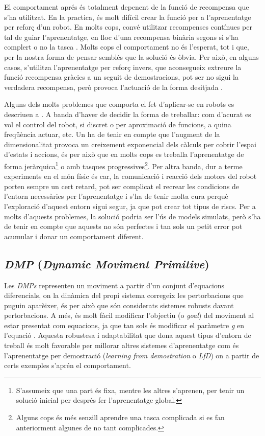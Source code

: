 \documentclass[12pt,a4paper,final,twoside]{report}
\begin{document}
El comportament aprés és totalment depenent de la funció de recompensa que s'ha utilitzat. En la practica, és molt difícil crear la funció per a l'aprenentatge per reforç d'un robot. En molts cops, convé utilitzar recompenses contínues per tal de guiar l'aprenentatge, en lloc d'una recompensa binària segons si s'ha complert o no la tasca \cite{Laud2004}. Molts cops el comportament no és l'esperat, tot i que, per la nostra forma de pensar semblés que la solució és òbvia. Per això, en alguns casos, s'utilitza l'aprenentatge per reforç invers, que aconsegueix extreure la funció recompensa gràcies a un seguit de demostracions, pot ser no sigui la verdadera recompensa, però provoca l'actuació de la forma desitjada \cite{Kober2009}.

Alguns dels molts problemes que comporta el fet d'aplicar-se en robots es descriuen a \cite{Kober2009}. A banda d'haver de decidir la forma de treballar: com d'acurat es vol el control del robot, si discret o per aproximació de funcions, a quina freqüència actuar, etc. Un ha de tenir en compte que l'augment de la dimensionalitat provoca un creixement exponencial dels càlculs per cobrir l'espai d'estats i accions, és per això que en molts cops es treballa l'aprenentatge de forma jeràrquica\footnote{S'assumeix que una part és fixa, mentre les altres s'aprenen, per tenir un solució inicial per després fer l'aprenentatge global.} o amb tasques progressives\footnote{Alguns cops és més senzill aprendre una tasca complicada si es fan anteriorment algunes de no tant complicades.}. 
Per altra banda, dur a terme experiments en el món físic és car, la comunicació i reacció dels motors del robot porten sempre un cert retard, pot ser complicat el recrear les condicions de l'entorn necessàries per l'aprenentatge i s'ha de tenir molta cura perquè l'exploració d'aquest entorn sigui segur, ja que pot crear tot tipus de riscs. Per a molts d'aquests problemes, la solució podria ser l'ús de models simulats, però s'ha de tenir en compte que aquests no són perfectes i tan sols un petit error pot acumular i donar un comportament diferent.

\subsection{\textit{DMP} (\textit{\textbf{D}ynamic \textbf{M}oviment \textbf{P}rimitive})}
\label{DMP-estat-de-l'art}

Les \textit{DMPs} representen un moviment a partir d'un conjunt d'equacions diferencials, on la dinàmica del propi sistema corregeix les pertorbacions que puguin aparèixer, és per això que són considerats sistemes robusts davant pertorbacions. A més, és molt fàcil modificar l'objectiu (o \textit{goal}) del moviment al estar presentat com equacions, ja que tan sols és modificar el paràmetre \textit{g} en l'equació . Aquesta robustesa i adaptabilitat que dona aquest tipus d'entorn de treball és molt favorable per millorar altres sistemes d'aprenentatge com és l'aprenentatge per demostració (\textit{learning from demostration} o \textit{LfD}) on a partir de certs exemples s'aprén el comportament.
\end{document}
